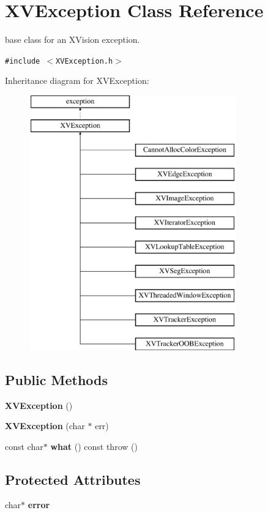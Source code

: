 \hypertarget{class_XVException}{
\section{XVException  Class Reference}
\label{XVException}
}
base class for an XVision exception. 


{\tt \#include $<$XVException.h$>$}

Inheritance diagram for XVException:\begin{figure}[H]
\begin{center}
\leavevmode
\includegraphics[height=11cm]{class_XVException}
\end{center}
\end{figure}
\subsection*{Public Methods}
\begin{CompactItemize}
\item 
{\bf XVException} ()
\item 
{\bf XVException} (char $\ast$ err)
\item 
const char$\ast$ {\bf what} () const  throw ()
\end{CompactItemize}
\subsection*{Protected Attributes}
\begin{CompactItemize}
\item 
char$\ast$ {\bf error}
\end{CompactItemize}


